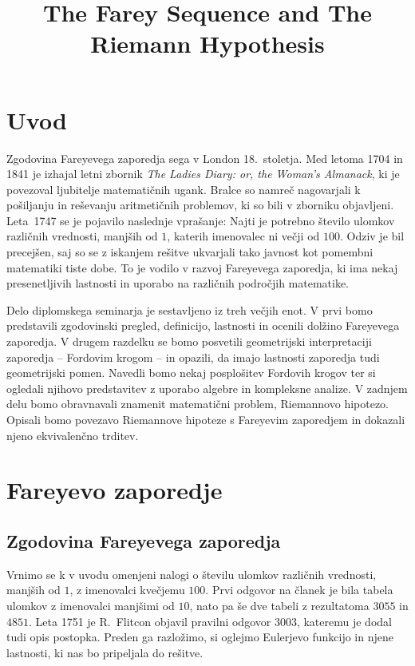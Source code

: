 \documentclass[mat1]{fmfdelo}
\title{The Farey Sequence and The Riemann Hypothesis}
\begin{document}
%
\section{Uvod}

Zgodovina Fareyevega zaporedja sega v London 18.~stoletja. Med letoma 1704 in 1841 je izhajal letni zbornik \emph{The Ladies Diary: or, the Woman's Almanack}, ki je povezoval ljubitelje matematičnih ugank. Bralce so namreč nagovarjali k pošiljanju in reševanju aritmetičnih problemov, ki so bili v zborniku objavljeni. Leta~1747 se je pojavilo naslednje vprašanje: Najti je potrebno število ulomkov različnih vrednosti, manjših od $1$, katerih imenovalec ni večji od $100$. Odziv je bil precejšen, saj so se z iskanjem rešitve ukvarjali tako javnost kot pomembni matematiki tiste dobe. To je vodilo v razvoj Fareyevega zaporedja, ki ima nekaj presenetljivih lastnosti in uporabo na različnih področjih matematike.

Delo diplomskega seminarja je sestavljeno iz treh večjih enot. V prvi bomo predstavili zgodovinski pregled, definicijo, lastnosti in ocenili dolžino Fareyevega zaporedja. V drugem razdelku se bomo posvetili geometrijski interpretaciji zaporedja -- Fordovim krogom -- in opazili, da imajo lastnosti zaporedja tudi geometrijski pomen. Navedli bomo nekaj posplošitev Fordovih krogov ter si ogledali njihovo predstavitev z uporabo algebre in kompleksne analize. V zadnjem delu bomo obravnavali znamenit matematični problem, Riemannovo hipotezo. Opisali bomo povezavo Riemannove hipoteze s Fareyevim zaporedjem in dokazali njeno ekvivalenčno trditev. 

%
\section{Fareyevo zaporedje}

%
\subsection{Zgodovina Fareyevega zaporedja}

Vrnimo se k v uvodu omenjeni nalogi o številu ulomkov različnih vrednosti, manjših od $1$, z imenovalci kvečjemu $100$. Prvi odgovor na članek je bila tabela ulomkov z imenovalci manjšimi od $10$, nato pa še dve tabeli z rezultatoma $3055$ in $4851$. Leta 1751 je R.~Flitcon objavil pravilni odgovor $3003$, kateremu je dodal tudi opis postopka. Preden ga razložimo, si oglejmo Eulerjevo funkcijo in njene lastnosti, ki nas bo pripeljala do rešitve. 
%
\end{document}
